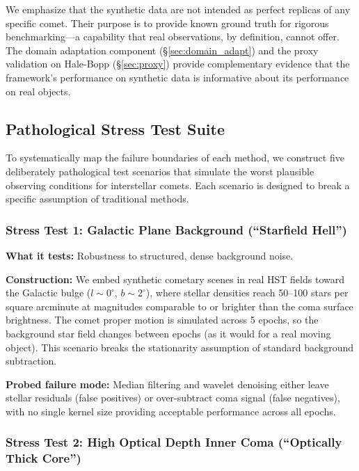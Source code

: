 \documentclass[usenatbib]{mnras}
\begin{document}
We emphasize that the synthetic data are not intended as perfect replicas of any specific comet. Their purpose is to provide known ground truth for rigorous benchmarking---a capability that real observations, by definition, cannot offer. The domain adaptation component (\S\ref{sec:domain_adapt}) and the proxy validation on Hale-Bopp (\S\ref{sec:proxy}) provide complementary evidence that the framework's performance on synthetic data is informative about its performance on real objects.

\subsection{Pathological Stress Test Suite}\label{sec:stress}

To systematically map the failure boundaries of each method, we construct five deliberately pathological test scenarios that simulate the worst plausible observing conditions for interstellar comets. Each scenario is designed to break a specific assumption of traditional methods.

\subsubsection{Stress Test 1: Galactic Plane Background (``Starfield Hell'')}

\textbf{What it tests:} Robustness to structured, dense background noise.

\textbf{Construction:} We embed synthetic cometary scenes in real HST fields toward the Galactic bulge ($l \sim 0^\circ$, $b \sim 2^\circ$), where stellar densities reach 50--100 stars per square arcminute at magnitudes comparable to or brighter than the coma surface brightness. The comet proper motion is simulated across 5 epochs, so the background star field changes between epochs (as it would for a real moving object). This scenario breaks the stationarity assumption of standard background subtraction.

\textbf{Probed failure mode:} Median filtering and wavelet denoising either leave stellar residuals (false positives) or over-subtract coma signal (false negatives), with no single kernel size providing acceptable performance across all epochs.

\subsubsection{Stress Test 2: High Optical Depth Inner Coma (``Optically Thick Core'')}
\end{document}
